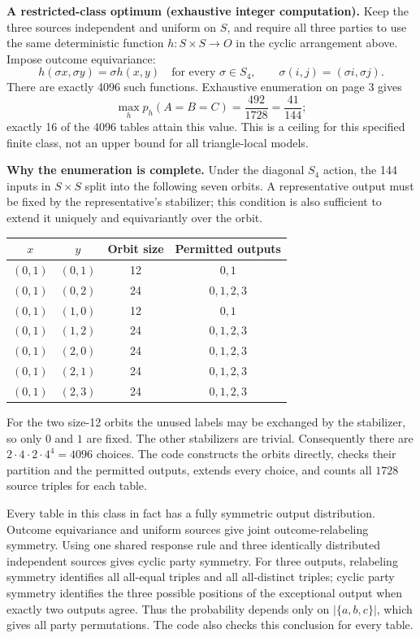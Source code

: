 \documentclass[11pt]{article}
\begin{document}
\newpage
\textbf{A restricted-class optimum (exhaustive integer computation).}
Keep the three sources independent and uniform on $S$, and require all three
parties to use the same deterministic function $h:S\times S\to O$ in the
cyclic arrangement above. Impose outcome equivariance:
\[
 h(\sigma x,\sigma y)=\sigma h(x,y)\quad\text{for every }\sigma\in S_4,
 \qquad \sigma(i,j)=(\sigma i,\sigma j).
\]
There are exactly 4096 such functions. Exhaustive enumeration on page 3 gives
\[
 \max_h p_h(A=B=C)=\frac{492}{1728}=\frac{41}{144};
\]
exactly 16 of the 4096 tables attain this value. This is a ceiling for this
specified finite class, not an upper bound for all triangle-local models.

\textbf{Why the enumeration is complete.}
Under the diagonal $S_4$ action, the 144 inputs in $S\times S$ split into the
following seven orbits. A representative output must be fixed by the
representative's stabilizer; this condition is also sufficient to extend it
uniquely and equivariantly over the orbit.
\begin{center}
\begin{tabular}{@{}cccc@{}}
\toprule
$x$ & $y$ & Orbit size & Permitted outputs\\
\midrule
$(0,1)$ & $(0,1)$ & 12 & $0,1$\\
$(0,1)$ & $(0,2)$ & 24 & $0,1,2,3$\\
$(0,1)$ & $(1,0)$ & 12 & $0,1$\\
$(0,1)$ & $(1,2)$ & 24 & $0,1,2,3$\\
$(0,1)$ & $(2,0)$ & 24 & $0,1,2,3$\\
$(0,1)$ & $(2,1)$ & 24 & $0,1,2,3$\\
$(0,1)$ & $(2,3)$ & 24 & $0,1,2,3$\\
\bottomrule
\end{tabular}
\end{center}
For the two size-12 orbits the unused labels may be exchanged by the
stabilizer, so only $0$ and $1$ are fixed. The other stabilizers are trivial.
Consequently there are $2\cdot4\cdot2\cdot4^4=4096$ choices. The code constructs
the orbits directly, checks their partition and the permitted outputs, extends
every choice, and counts all $1728$ source triples for each table.

Every table in this class in fact has a fully symmetric output distribution.
Outcome equivariance and uniform sources give joint outcome-relabeling symmetry.
Using one shared response rule and three identically distributed independent
sources gives cyclic party symmetry. For three outputs, relabeling symmetry
identifies all all-equal triples and all all-distinct triples; cyclic party
symmetry identifies the three possible positions of the exceptional output
when exactly two outputs agree. Thus the probability depends only on
$|\{a,b,c\}|$, which gives all party permutations. The code also checks this
conclusion for every table.
\end{document}
